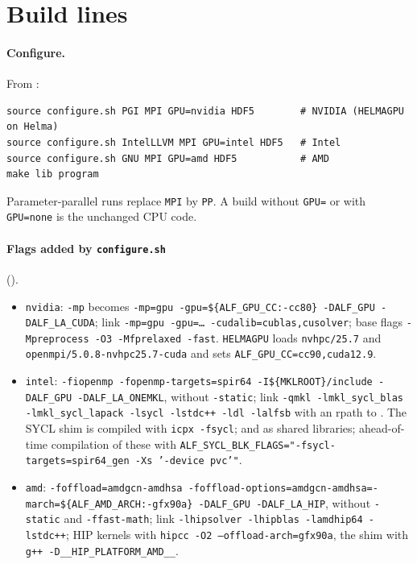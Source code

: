 \section{Build lines}
\label{app:build}

\paragraph{Configure.} From :
\begin{lstlisting}
source configure.sh PGI MPI GPU=nvidia HDF5        # NVIDIA (HELMAGPU on Helma)
source configure.sh IntelLLVM MPI GPU=intel HDF5   # Intel
source configure.sh GNU MPI GPU=amd HDF5           # AMD
make lib program
\end{lstlisting}
Parameter-parallel runs replace \texttt{MPI} by \texttt{PP}. A build without \texttt{GPU=} or with \texttt{GPU=none} is the unchanged CPU code.

\paragraph{Flags added by \texttt{configure.sh}} ().
\begin{itemize}
\item \texttt{nvidia}: \texttt{-mp} becomes \texttt{-mp=gpu -gpu=\$\{ALF\_GPU\_CC:-cc80\} -DALF\_GPU -DALF\_LA\_CUDA}; link \texttt{-mp=gpu -gpu=\ldots\ -cudalib=cublas,cusolver}; base flags \texttt{-Mpreprocess -O3 -Mfprelaxed -fast}. \texttt{HELMAGPU} loads \texttt{nvhpc/25.7} and \texttt{openmpi/5.0.8-nvhpc25.7-cuda} and sets \texttt{ALF\_GPU\_CC=cc90,cuda12.9}.
\item \texttt{intel}: \texttt{-fiopenmp -fopenmp-targets=spir64 -I\$\{MKLROOT\}/include -DALF\_GPU -DALF\_LA\_ONEMKL}, without \texttt{-static}; link \texttt{-qmkl -lmkl\_sycl\_blas -lmkl\_sycl\_lapack -lsycl -lstdc++ -ldl -lalfsb} with an rpath to . The SYCL shim is compiled with \texttt{icpx -fsycl};  and  as shared libraries; ahead-of-time compilation of these with \texttt{ALF\_SYCL\_BLK\_FLAGS="-fsycl-targets=spir64\_gen -Xs '-device pvc'"}.
\item \texttt{amd}: \texttt{-foffload=amdgcn-amdhsa -foffload-options=amdgcn-amdhsa=-march=\$\{ALF\_AMD\_ARCH:-gfx90a\} -DALF\_GPU -DALF\_LA\_HIP}, without \texttt{-static} and \texttt{-ffast-math}; link \texttt{-lhipsolver -lhipblas -lamdhip64 -lstdc++}; HIP kernels with \texttt{hipcc -O2 --offload-arch=gfx90a}, the shim with \texttt{g++ -D\_\_HIP\_PLATFORM\_AMD\_\_}.
\end{itemize}

